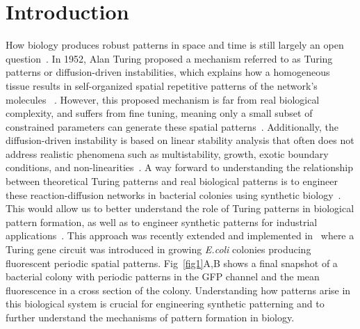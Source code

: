 \section*{Introduction}

How biology produces robust patterns in space and time is still largely an open question~\parencite{scholes2017three}.
In 1952, Alan Turing proposed a mechanism referred to as Turing patterns or diffusion-driven instabilities, which explains how a homogeneous tissue results in self-organized spatial repetitive patterns of the network’s molecules ~\parencite{Turing1952, Gierer1972}.
However, this proposed mechanism is far from real biological complexity, and suffers from fine tuning, meaning only a small subset of constrained parameters can generate these spatial patterns~\parencite{maini2012turing, Scholes2019}.
Additionally, the diffusion-driven instability is based on linear stability analysis that often does not address realistic phenomena such as multistability, growth, exotic boundary conditions, and non-linearities~\parencite{Krause2023}.
A way forward to understanding the relationship between theoretical Turing patterns and real biological patterns is to engineer these reaction-diffusion networks in bacterial colonies using synthetic biology~\parencite{Sekine2018, Karig2018}.
This would allow us to better understand the role of Turing patterns in biological pattern formation, as well as to engineer synthetic patterns for industrial applications~\parencite{cao2017programmable, tan2018polyamide,din2020interfacing}.
This approach was recently extended and implemented in~\cite{Oliver2023} where a Turing gene circuit was introduced in growing \textit{E.coli} colonies producing fluorescent periodic spatial patterns. Fig~\ref{fig1}A,B shows a final snapshot of a bacterial colony with periodic patterns in the GFP channel and the mean fluorescence in a cross section of the colony.
Understanding how patterns arise in this biological system is crucial for engineering synthetic patterning and to further understand the mechanisms of pattern formation in biology.

